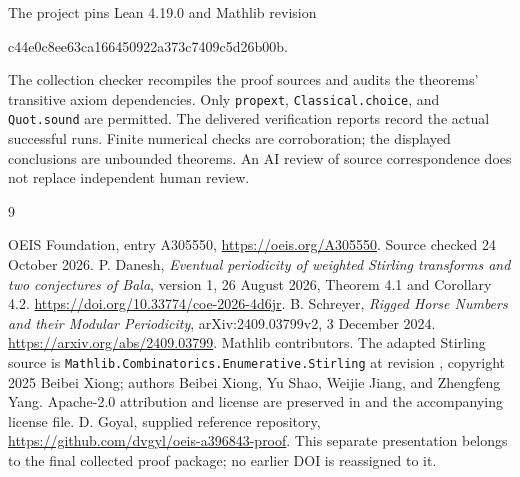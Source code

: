 \documentclass[11pt,a4paper]{article}
\theoremstyle{remark}
\begin{document}
The project pins Lean 4.19.0 and Mathlib revision
\begin{center}\small\ttfamily
c44e0c8ee63ca166450922a373c7409c5d26b00b.
\end{center}
The collection checker recompiles the proof sources and audits the
theorems' transitive axiom dependencies. Only \texttt{propext},
\texttt{Classical.choice}, and \texttt{Quot.sound} are permitted.
The delivered verification reports record the actual successful runs.
Finite numerical checks are corroboration; the displayed conclusions are
unbounded theorems. An AI review of source correspondence does not replace
independent human review.
\begin{thebibliography}{9}
\raggedright
{} OEIS Foundation, entry A305550,
\url{https://oeis.org/A305550}. Source checked 24 October 2026.
 P. Danesh, \emph{Eventual periodicity of weighted
Stirling transforms and two conjectures of Bala}, version 1,
26 August 2026, Theorem 4.1 and Corollary 4.2.
\url{https://doi.org/10.33774/coe-2026-4d6jr}.
 B. Schreyer, \emph{Rigged Horse Numbers and their
Modular Periodicity}, arXiv:2409.03799v2, 3 December 2024.
\url{https://arxiv.org/abs/2409.03799}.
 Mathlib contributors. The adapted Stirling source is
\texttt{Mathlib.Combinatorics.Enumerative.Stirling} at revision
, copyright 2025 Beibei Xiong;
authors Beibei Xiong, Yu Shao, Weijie Jiang, and Zhengfeng Yang.
Apache-2.0 attribution and license are preserved in
 and the accompanying license file.
 D. Goyal, supplied reference repository,
\url{https://github.com/dvgyl/oeis-a396843-proof}.
This separate presentation belongs to the final collected proof package;
no earlier DOI is reassigned to it.
\end{thebibliography}
\end{document}
